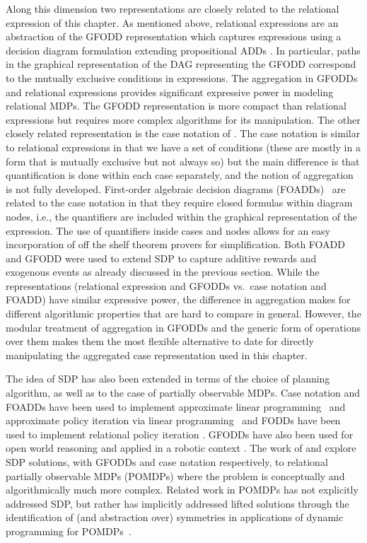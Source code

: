 Along this dimension two representations are closely related to the
relational expression of this chapter.  As mentioned above, relational
expressions are an abstraction of the GFODD representation
\citep{JoshiKeKh11,JoshiKhRaTaFe13,HescottKh15} which captures
expressions using a decision diagram formulation extending
propositional ADDs \cite{BaharFrGaHaMaPaSo93}.  In particular, paths
in the graphical representation of the DAG representing the GFODD
correspond to the mutually exclusive conditions in expressions. The
aggregation in GFODDs and relational expressions provides significant
expressive power in modeling relational MDPs. The GFODD representation
is more compact than relational expressions but requires more complex
algorithms for its manipulation.  The other closely related
representation is the case notation of
\cite{BoutilierRePr01,SannerBo09}.  The case notation is similar to
relational expressions in that we have a set of conditions (these are
mostly in a form that is mutually exclusive but not always so) but the
main difference is that quantification is done within each case
separately, and the notion of aggregation is not fully developed.
First-order algebraic decision diagrams
(FOADDs)~\citep{Sanner08,SannerBo09} are related to the case
notation in that they require closed formulas within diagram nodes,
i.e., the quantifiers are included within the graphical representation
of the expression.  The use of quantifiers inside cases and nodes
allows for an easy incorporation of off the shelf theorem provers for
simplification.
%
Both FOADD and GFODD were used to extend SDP to capture additive rewards and exogenous events as already discussed in the previous section.
While the representations (relational expression and GFODDs vs.\ case notation and FOADD) have similar expressive power, the difference in aggregation makes for different algorithmic properties that are hard to compare in general. 
However, the modular treatment of aggregation in GFODDs and the generic form of operations over them makes them the most flexible alternative to date for directly manipulating the aggregated case representation used in this chapter.
%

The idea of SDP has also been extended in terms of the choice of
planning algorithm, as well as to the case of partially observable
MDPs.  Case notation and FOADDs have been used to implement
approximate linear programming~\citep{foalp,SannerBo09} and
approximate policy iteration via linear programming~\citep{foapi} and
FODDs have been used to implement relational policy iteration
\cite{WangKh07}.  GFODDs have also been used for open world reasoning
and applied in a robotic context \cite{JoshiSKS12}.  The work of
\cite{WangK10} and \cite{SannerK10} explore SDP solutions, with GFODDs
and case notation respectively, to relational partially observable MDPs (POMDPs) where the
problem is conceptually and algorithmically much more complex.
Related work in POMDPs has not explicitly addressed SDP, but rather has
implicitly addressed lifted solutions through the identification of (and
abstraction over) symmetries in applications of dynamic programming
for POMDPs~\cite{doshi:permpomdp08,kim:sympomdp12}.


